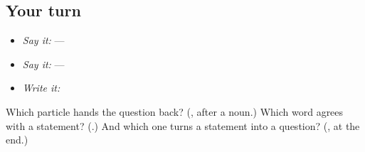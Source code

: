 \subsection*{Your turn}
\begin{itemize}
\raggedright
  \item \emph{Say it:}  — 
  \item \emph{Say it:}  — 
  \item \emph{Write it:}  
\end{itemize}

\begin{tcolorbox}[breakable,colback=teal!4,colframe=teal!35!black,title={Before you move on}]
Which particle hands the question back? (\textbf{}, after a noun.) Which word agrees with a statement? (\textbf{}.) And which one turns a statement into a question? (\textbf{}, at the end.)
\end{tcolorbox}
